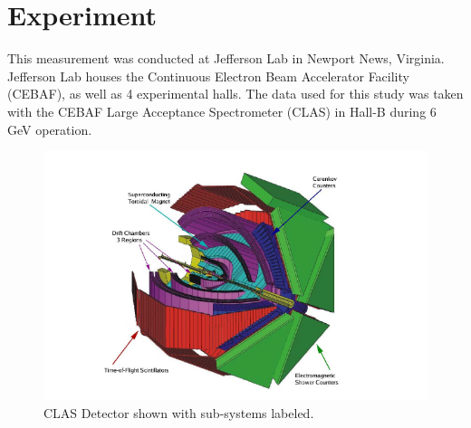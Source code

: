 \section{Experiment}


This measurement was conducted at Jefferson Lab in Newport News, Virginia.  Jefferson Lab houses the Continuous Electron Beam Accelerator Facility (CEBAF), as well as 4 experimental halls.  The data used for this study was taken with the CEBAF Large Acceptance Spectrometer (CLAS) in Hall-B during 6 GeV operation.  \\

\begin{figure}
  \label{fig:clas}
  \begin{center}
    \includegraphics[width=\columnwidth]{image/clas.png}
    \caption{CLAS Detector shown with sub-systems labeled.}
  \end{center}
\end{figure}


